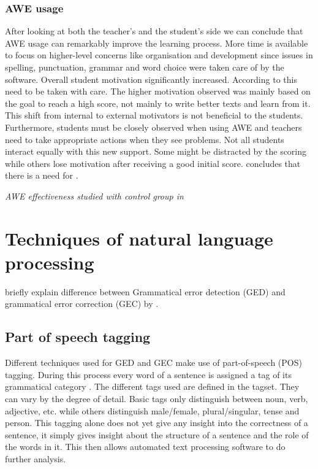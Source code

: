\documentclass[runningheads]{llncs}
\begin{document}
\subsubsection{AWE usage} After looking at both the teacher's and the student's side we can conclude that AWE usage can remarkably improve the learning process. More time is available to focus on higher-level concerns like organisation and development since issues in spelling, punctuation, grammar and word choice were taken care of by the software. Overall student motivation significantly increased. According to \textcite{grimes_utility_2010} this need to be taken with care. The higher motivation observed was mainly based on the goal to reach a high score, not mainly to write better texts and learn from it. This shift from internal to external motivators is not beneficial to the students. Furthermore, students must be closely observed when using AWE and teachers need to take appropriate actions when they see problems. Not all students interact equally with this new support. Some might be distracted by the scoring while others lose motivation after receiving a good initial score. \citeauthor{grimes_utility_2010} concludes that there is a need for .

\vspace*{6mm}\hspace*{6mm} \textit{AWE effectiveness studied with control group in \cite{wang_exploring_2013}}  \par


\section{Techniques of natural language processing}
briefly explain difference between Grammatical error detection (GED) and grammatical error correction (GEC) by \cite{bell_context_2019}.

\subsection{Part of speech tagging}
Different techniques used for GED and GEC make use of part-of-speech (POS) tagging. During this process every word of a sentence is assigned a tag of its grammatical category \citep{noauthor_pos_2018}. The different tags used are defined in the tagset. They can vary by the degree of detail. Basic tags only distinguish between noun, verb, adjective, etc. while others distinguish male/female, plural/singular, tense and person. This tagging alone does not yet give any insight into the correctness of a sentence, it simply gives insight about the structure of a sentence and the role of the words in it. This then allows automated text processing software to do further analysis.
\end{document}
